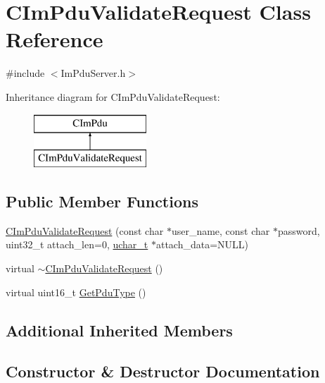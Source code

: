 \hypertarget{class_c_im_pdu_validate_request}{}\section{C\+Im\+Pdu\+Validate\+Request Class Reference}
\label{class_c_im_pdu_validate_request}


{\ttfamily \#include $<$Im\+Pdu\+Server.\+h$>$}

Inheritance diagram for C\+Im\+Pdu\+Validate\+Request\+:\begin{figure}[H]
\begin{center}
\leavevmode
\includegraphics[height=2.000000cm]{class_c_im_pdu_validate_request}
\end{center}
\end{figure}
\subsection*{Public Member Functions}
\begin{DoxyCompactItemize}
\item 
\hyperlink{class_c_im_pdu_validate_request_a9d6ae46fdb505105715b2dbed992d695}{C\+Im\+Pdu\+Validate\+Request} (const char $\ast$user\+\_\+name, const char $\ast$password, uint32\+\_\+t attach\+\_\+len=0, \hyperlink{base_2ostype_8h_a124ea0f8f4a23a0a286b5582137f0b8d}{uchar\+\_\+t} $\ast$attach\+\_\+data=N\+U\+L\+L)
\item 
virtual \hyperlink{class_c_im_pdu_validate_request_ad1b51f4185fa9f66a6e83365f86a0ef1}{$\sim$\+C\+Im\+Pdu\+Validate\+Request} ()
\item 
virtual uint16\+\_\+t \hyperlink{class_c_im_pdu_validate_request_a19967ce57caa1b7d43a9d74c13ba8a01}{Get\+Pdu\+Type} ()
\end{DoxyCompactItemize}
\subsection*{Additional Inherited Members}


\subsection{Constructor \& Destructor Documentation}
\hypertarget{class_c_im_pdu_validate_request_a9d6ae46fdb505105715b2dbed992d695}{}
